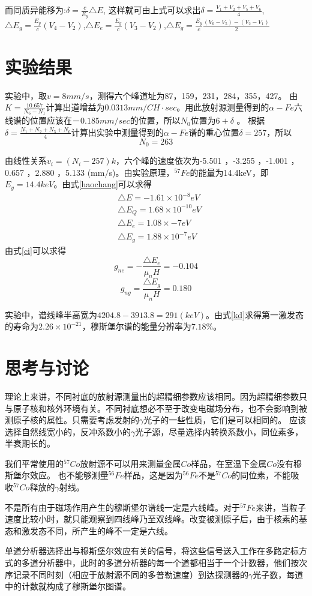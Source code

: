 \documentclass[hyperref]{ctexart}
\begin{document}
\begin{multicols}{2}
	而同质异能移为:$\delta=\frac{c}{E_y}\triangle E$, 这样就可由上式可以求出$\delta=\frac{V_1+V_2+V_5+V_6}{4}$,$\triangle E_g=\frac{E_y}{c}(V_4-V_2)$,$\triangle E_e=\frac{E_y}{c}(V_3-V_2)$,$\triangle E_g=\frac{E_y}{c}\frac{(V_6-V_5)-(V_2-V_1)}{2}$

	\section{实验结果}
	实验中，取$v=8mm/s$，测得六个峰道址为87，159，231，284，355，427。
	由$K=\frac{10.657}{N_6-N_1}$计算出道增益为$0.0313mm/CH\cdot sec$。用此放射源测量得到的$\alpha-Fe$六线谱的位置应该在$－0.185mm/sec$的位置，所以$N_0$位置为$6+\delta$ 。
	根据$\delta = \frac{N_1+N_2+N_5+N_6}{4}$计算出实验中测量得到的$\alpha-Fe$谱的重心位置$\delta=257$，所以$$N_0=263$$

	由线性关系$v_i=(N_i-257)k$，六个峰的速度依次为-5.501 ，-3.255 ，-1.001 ，0.657 ，2.880 ，5.133 (mm/s)。由实验原理，$^{57}Fe$的能量为14.4keV，即$E_y=14.4keV$。由式\eqref{haochang}可以求得
	\begin{equation}
	\begin{aligned}
	&\triangle E = -1.61\times 10^{-8}eV\\
	&\triangle E_Q = 1.68 \times 10^{-10}eV\\
	&\triangle E_e = 1.08 \times {-7}eV\\
	&\triangle E_g = 1.88 \times 10^{-7}eV
	\end{aligned}
	\end{equation}
由式\eqref{ci}可以求得$$g_{ne}=-\frac{\triangle E_e}{\mu_n H}=-0.104$$ $$g_{ng}=\frac{\triangle E_g}{\mu_n H}=0.180$$

	实验中，谱线峰半高宽为$4204.8-3913.8=291(keV)$。由式\eqref{kd}求得第一激发态的寿命为$2.26 \times 10^{-21}$，穆斯堡尔谱的能量分辨率为$7.18\%$。

	\section{思考与讨论}
	理论上来讲，不同衬底的放射源测量出的超精细参数应该相同。因为超精细参数只与原子核和核外环境有关。不同衬底想必不至于改变电磁场分布，也不会影响到被测原子核的属性。只需要考虑发射的$\gamma$光子的一些性质，它们是可以相同的。
	应该选择自然线宽小的，反冲系数小的$\gamma$光子源，尽量选择内转换系数小，同位素多，半衰期长的。
	
	我们平常使用的$^{57}Co$放射源不可以用来测量金属$Co$样品，在室温下金属$Co$没有穆斯堡尔效应。
	也不能够测量$^{56}Fe$样品，这是因为$^{56}Fe$不是$^{57}Co$的同位素，不能吸收$^{57}Co$释放的$\gamma$射线。

	不是所有由于磁场作用产生的穆斯堡尔谱线一定是六线峰。对于$^{57}Fe$来讲，当粒子速度比较小时，就只能观察到四线峰乃至双线峰。改变被测原子后，由于核素的基态和激发态不同，所产生的峰不一定是六线。

	单道分析器选择出与穆斯堡尔效应有关的信号，将这些信号送入工作在多路定标方式的多道分析器中，此时的多道分析器的每一个道都相当于一个计数器，他们按次序记录不同时刻（相应于放射源不同的多普勒速度）到达探测器的$\gamma$光子数，每道中的计数就构成了穆斯堡尔图谱。



\end{multicols}
\end{document}
